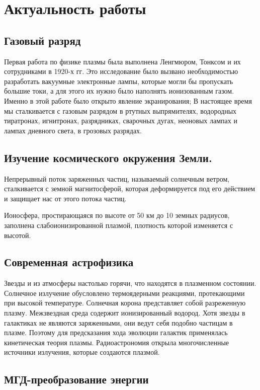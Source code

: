 



\section{Актуальность работы} %
\subsection{Газовый разряд}
Первая работа по физике плазмы была выполнена Ленгмюром, Тонксом и их сотрудниками в 1920-х гг. Это исследование было вызвано
необходимостью разработать вакуумные электронные лампы, 
которые могли бы пропускать большие токи, а для этого их нужно
было наполнять ионизованным газом. Именно в этой работе
было открыто явление экранирования; В настоящее время мы сталкивается с газовым разрядом
в ртутных выпрямителях, водородных тиратронах, игнитронах,
разрядниках, сварочных дугах, неоновых лампах и лампах 
дневного света, в грозовых разрядах.


\subsection{Изучение космического окружения Земли.}

Непрерывный поток заряженных частиц, называемый солнечным ветром,
сталкивается с земной магнитосферой, которая деформируется под его действием и защищает нас от этого потока частиц.

Ионосфера, простирающаяся по высоте от 50 км до 10 земных радиусов, заполнена слабоионизированной плазмой, плотность которой изменяется с высотой. 

\subsection{Современная астрофизика}

Звезды и из атмосферы настолько горячи, что находятся в плазменном состоянии. Солнечное излучение обусловлено термоядерными реакциями, протекающими при высокой температуре. Солнечная корона представляет собой разреженную плазму. Межзвездная среда содержит ионизированный водород. 
Хотя звезды в галактиках не являются заряженными, они ведут себя подобно частицам в плазме. Поэтому для предсказания хода эволюции галактик применялась кинетическая теория плазмы. Радиоастрономия открыла многочисленные источники излучения, которые создаются плазмой. 

\subsection{МГД-преобразование энергии}

